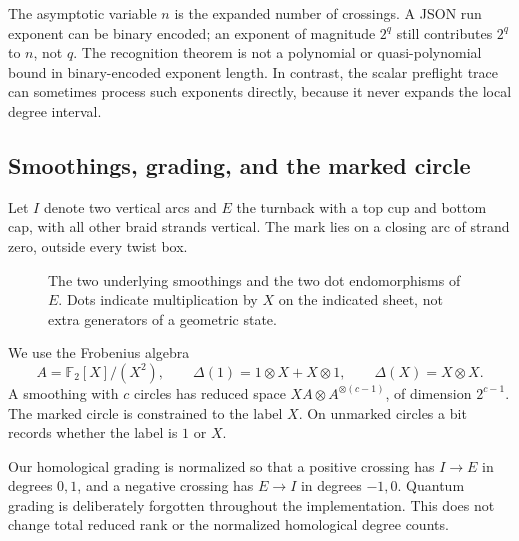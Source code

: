 \documentclass[11pt,letterpaper]{article}
\theoremstyle{definition}
\newcommand{\F}{\mathbb F_2}
\begin{document}
The asymptotic variable \(n\) is the expanded number of crossings. A JSON run exponent can be binary encoded; an exponent of magnitude \(2^q\) still contributes \(2^q\) to \(n\), not \(q\). The recognition theorem is not a polynomial or quasi-polynomial bound in binary-encoded exponent length. In contrast, the scalar preflight trace can sometimes process such exponents directly, because it never expands the local degree interval.

\subsection{Smoothings, grading, and the marked circle}
Let \(I\) denote two vertical arcs and \(E\) the turnback with a top cup and bottom cap, with all other braid strands vertical. The mark lies on a closing arc of strand zero, outside every twist box.

\begin{figure}[ht]
\centering
{}
\caption{The two underlying smoothings and the two dot endomorphisms of \(E\). Dots indicate multiplication by \(X\) on the indicated sheet, not extra generators of a geometric state.}
\label{fig:smoothings}
\end{figure}

We use the Frobenius algebra
\[
 A=\F[X]/(X^2),\qquad
 \Delta(1)=1\otimes X+X\otimes1,\qquad
 \Delta(X)=X\otimes X.
\]
A smoothing with \(c\) circles has reduced space
\(XA\otimes A^{\otimes(c-1)}\), of dimension \(2^{c-1}\).
The marked circle is constrained to the label \(X\). On unmarked circles a bit records whether the label is \(1\) or \(X\).

Our homological grading is normalized so that a positive crossing has
\(I\to E\) in degrees \(0,1\), and a negative crossing has
\(E\to I\) in degrees \(-1,0\). Quantum grading is deliberately forgotten throughout the implementation. This does not change total reduced rank or the normalized homological degree counts.
\end{document}
